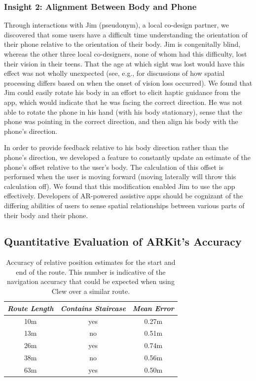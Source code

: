 \documentclass[chi_draft]{sigchi}
\begin{document}
\subsubsection{Insight 2: Alignment Between Body and Phone}
Through interactions with Jim (pseudonym), a local co-design partner, we discovered that some users have a difficult time understanding the orientation of their phone relative to the orientation of their body.  Jim is congenitally blind, whereas the other three local co-designers, none of whom had this difficulty, lost their vision in their teens.  That the age at which sight was lost would have this effect was not wholly unexpected (see, e.g., \cite{long1997establishing, wiener2010foundations, schinazi2016spatial, thinus1997representation, williams2014just} for discussions of how spatial processing differs based on when the onset of vision loss occurred).  We found that Jim could easily rotate his body in an effort to elicit haptic guidance from the app, which would indicate that he was facing the correct direction.  He was not able to rotate the phone in his hand (with his body stationary), sense that the phone was pointing in the correct direction, and then align his body with the phone's direction.

In order to provide feedback relative to his body direction rather than the phone's direction, we developed a feature to constantly update an estimate of the phone's offset relative to the user's body.  The calculation of this offset is performed when the user is moving forward (moving laterally will throw this calculation off).  We found that this modification enabled Jim to use the app effectively.  Developers of AR-powered assistive apps should be cognizant of the differing abilities of users to sense spatial relationships between various parts of their body and their phone.

\subsection{Quantitative Evaluation of ARKit's Accuracy}

\begin{table}
  \centering
  \begin{tabular}{c c c}
    {\small \textit{Route Length}}
      & {\small \textit{Contains Staircase}}
        & {\small \textit{Mean Error}}  \\
    \midrule
    10m & yes  & 0.27m \\
    13m & no & 0.51m \\
    26m & yes & 0.74m \\
    38m & no & 0.56m \\
        63m & yes & 0.50m \\
  \end{tabular}
  \caption{Accuracy of relative position estimates for the start and end of the route.  This number is indicative of the navigation accuracy that could be expected when using Clew over a similar route.\label{tab:clewaccuracy}}%
\end{table}
\end{document}
